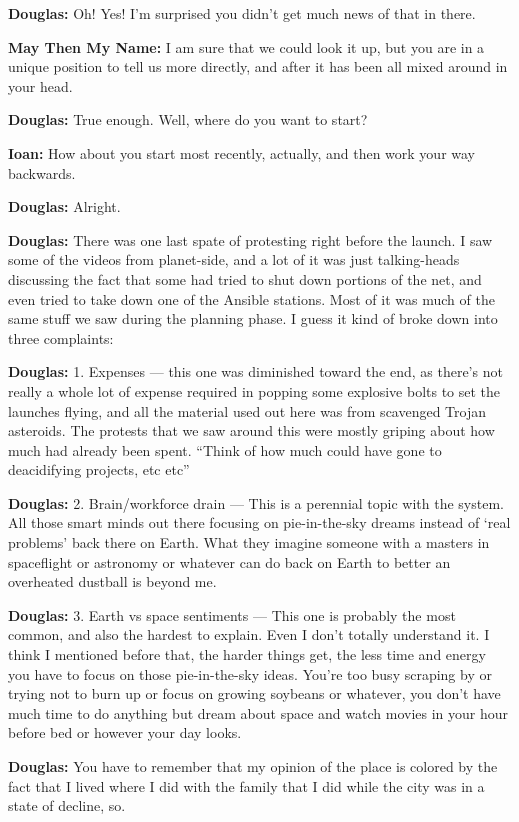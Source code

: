\textbf{Douglas:} Oh! Yes! I'm surprised you didn't get much news of that in there.

\textbf{May Then My Name:} I am sure that we could look it up, but you are in a unique position to tell us more directly, and after it has been all mixed around in your head.

\textbf{Douglas:} True enough. Well, where do you want to start?

\textbf{Ioan:} How about you start most recently, actually, and then work your way backwards.

\textbf{Douglas:} Alright.

\textbf{Douglas:} There was one last spate of protesting right before the launch. I saw some of the videos from planet-side, and a lot of it was just talking-heads discussing the fact that some had tried to shut down portions of the net, and even tried to take down one of the Ansible stations. Most of it was much of the same stuff we saw during the planning phase. I guess it kind of broke down into three complaints:

\textbf{Douglas:} 1. Expenses — this one was diminished toward the end, as there's not really a whole lot of expense required in popping some explosive bolts to set the launches flying, and all the material used out here was from scavenged Trojan asteroids. The protests that we saw around this were mostly griping about how much had already been spent. ``Think of how much could have gone to deacidifying projects, etc etc''

\textbf{Douglas:} 2. Brain/workforce drain — This is a perennial topic with the system. All those smart minds out there focusing on pie-in-the-sky dreams instead of `real problems' back there on Earth. What they imagine someone with a masters in spaceflight or astronomy or whatever can do back on Earth to better an overheated dustball is beyond me.

\textbf{Douglas:} 3. Earth vs space sentiments — This one is probably the most common, and also the hardest to explain. Even I don't totally understand it. I think I mentioned before that, the harder things get, the less time and energy you have to focus on those pie-in-the-sky ideas. You're too busy scraping by or trying not to burn up or focus on growing soybeans or whatever, you don't have much time to do anything but dream about space and watch movies in your hour before bed or however your day looks.

\textbf{Douglas:} You have to remember that my opinion of the place is colored by the fact that I lived where I did with the family that I did while the city was in a state of decline, so.

